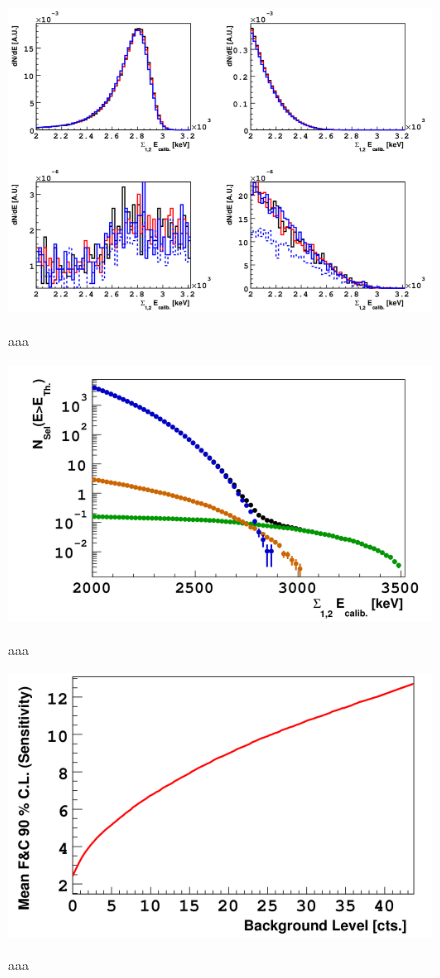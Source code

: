 \documentclass[main.tex]{subfiles}
\begin{document}
\begin{figure}[h!]
\centering
\includegraphics[scale=0.3]{pictures/Chap4/Distribution2eSelection.png}
\label{Distribution2eSelection.png}
\caption{aaa}
\end{figure}


\begin{figure}[h!]
\centering
\includegraphics[scale=0.3]{pictures/Chap4/ExpectedNumberofEvent.png}
\label{ExpectedNumberofEvent.png}
\caption{aaa}
\end{figure}


\begin{figure}[h!]
\centering
\includegraphics[scale=0.3]{pictures/Chap4/FeldmanAndCousin.png}
\label{FeldmanAndCousin.png}
\caption{aaa}
\end{figure}
\end{document}
